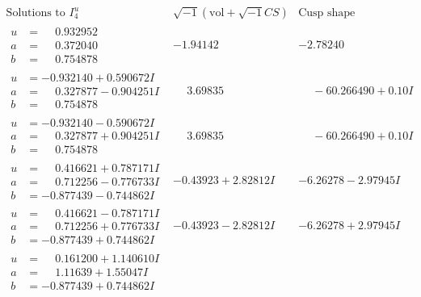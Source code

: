 \documentclass[1p]{elsarticle_modified}
\theoremstyle{definition}
\newcommand{\I}{\sqrt{-1}}
\begin{document}
$$\begin{array}{c|c|c}  
\text{Solutions to }I^u_{4}& \I (\text{vol} + \sqrt{-1}CS) & \text{Cusp shape}\\
 \hline 
\begin{aligned}
u &= \phantom{-}0.932952\phantom{ +0.000000I} \\
a &= \phantom{-}0.372040\phantom{ +0.000000I} \\
b &= \phantom{-}0.754878\phantom{ +0.000000I}\end{aligned}
 & -1.94142\phantom{ +0.000000I} & -2.78240\phantom{ +0.000000I} \\ \hline\begin{aligned}
u &= -0.932140 + 0.590672 I \\
a &= \phantom{-}0.327877 - 0.904251 I \\
b &= \phantom{-}0.754878\phantom{ +0.000000I}\end{aligned}
 & \phantom{-}3.69835\phantom{ +0.000000I} & \phantom{-}                -6
0.266490 + 0. 10   I\phantom{ +0.000000I} \\ \hline\begin{aligned}
u &= -0.932140 - 0.590672 I \\
a &= \phantom{-}0.327877 + 0.904251 I \\
b &= \phantom{-}0.754878\phantom{ +0.000000I}\end{aligned}
 & \phantom{-}3.69835\phantom{ +0.000000I} & \phantom{-}                -6
0.266490 + 0. 10   I\phantom{ +0.000000I} \\ \hline\begin{aligned}
u &= \phantom{-}0.416621 + 0.787171 I \\
a &= \phantom{-}0.712256 - 0.776733 I \\
b &= -0.877439 - 0.744862 I\end{aligned}
 & -0.43923 + 2.82812 I & -6.26278 - 2.97945 I \\ \hline\begin{aligned}
u &= \phantom{-}0.416621 - 0.787171 I \\
a &= \phantom{-}0.712256 + 0.776733 I \\
b &= -0.877439 + 0.744862 I\end{aligned}
 & -0.43923 - 2.82812 I & -6.26278 + 2.97945 I \\ \hline\begin{aligned}
u &= \phantom{-}0.161200 + 1.140610 I \\
a &= \phantom{-}1.11639 + 1.55047 I \\
b &= -0.877439 + 0.744862 I\end{aligned}

\end{array}$$
\end{document}
